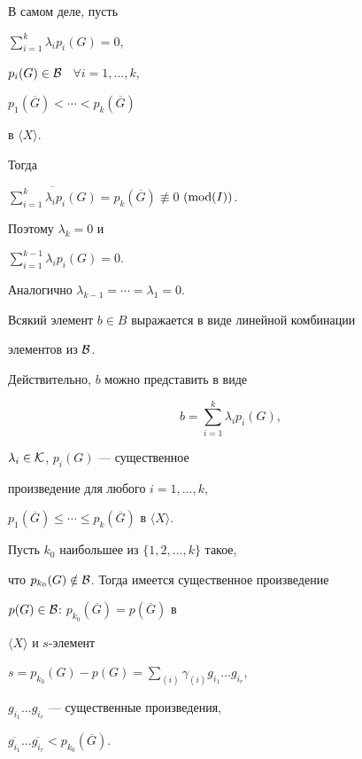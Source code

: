 В самом деле, пусть


$\sum\limits_{i=1}^{k}\lambda_{i}p_{i}(G)=0$,


$p_{i}(G)\in{\cal B}$ \ $\forall i=1,\dotsc, k$,


$p_{1}(\overline{G})<\dotsb< p_{k}(\overline{G})$


в $\langle X\rangle$.


Тогда


$\overline{\sum\limits_{i=1}^{k}\lambda_{i}p_{i}(G)}=p_{k}(\overline{G})


\not\equiv 0$ $(\Mod(I))$.


Поэтому $\lambda_{k}=0$ и


$\sum\limits_{i=1}^{k-1}\lambda_{i}p_{i}(G)=0$.


Аналогично $\lambda_{k-1}=\dotsb=\lambda_{1}=0$.





Всякий элемент $b\in B$ выражается в виде линейной комбинации


элементов из $\cal B$.


Действительно, $b$ можно представить в виде


\begin{equation} \label{b2}


b=\sum\limits_{i=1}^{k}\lambda_{i}p_{i}(G),


\end{equation}


$\lambda_{i}\in {\cal K}$, $p_{i}(G)$ --- существенное


произведение для любого $i=1,\dotsc,k$,


$p_{1}(\overline{G})\leq \dotsb


\leq p_{k}(\overline{G})$ в $\langle X\rangle$.





Пусть $k_{0}$ наибольшее из $\lbrace 1,2,\dotsc,k\rbrace$ такое,


что $p_{k_{0}}(G)\notin\cal B$. Тогда имеется существенное произведение


$p(G)\in\cal B$: $p_{k_{0}}(\overline{G})=p(\overline{G})$ в


$\langle X\rangle$ и $s$-элемент


$s=p_{k_{0}}(G)-p(G)=\sum\limits_{(i)}\gamma_{(i)}g_{i_{1}}\dotsc g_{i_{r}}$,


$g_{i_{1}}\dotsc g_{i_{r}}$ --- существенные произведения,


$\overline{g_{i_{1}}}\dotsc\overline{g_{i_{r}}}<p_{k_{0}}(\overline{G})$.



